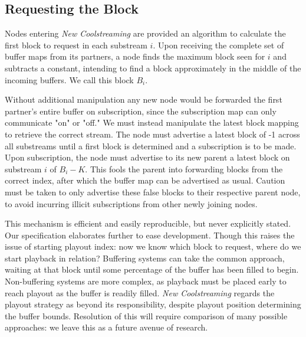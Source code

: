 \documentclass[12pt,a4paper]{article}
\begin{document}
\subsection{Requesting the Block} \label{problems:requesting}
Nodes entering \textit{New Coolstreaming} are provided an algorithm to calculate the first block to request in each substream \(i\). Upon receiving the complete set of buffer maps from its partners, a node finds the maximum block seen for \(i\) and subtracts a constant, intending to find a block approximately in the middle of the incoming buffers. We call this block \(B_i\).

Without additional manipulation any new node would be forwarded the first partner's entire buffer on subscription, since the subscription map can only communicate "on" or "off." We must instead manipulate the latest block mapping to retrieve the correct stream. The node must advertise a latest block of -1 across all substreams until a first block is determined and a subscription is to be made. Upon subscription, the node must advertise to its new parent a latest block on substream \(i\) of \(B_i - K\). This fools the parent into forwarding blocks from the correct index, after which the buffer map can be advertised as usual. Caution must be taken to only advertise these false blocks to their respective parent node, to avoid incurring illicit subscriptions from other newly joining nodes.

This mechanism is efficient and easily reproducible, but never explicitly stated. Our specification elaborates further to ease development. Though this raises the issue of starting playout index: now we know which block to request, where do we start playback in relation? Buffering systems can take the common approach, waiting at that block until some percentage of the buffer has been filled to begin. Non-buffering systems are more complex, as playback must be placed early to reach playout as the buffer is readily filled. \textit{New Coolstreaming} regards the playout strategy as beyond its responsibility, despite playout position determining the buffer bounds. Resolution of this will require comparison of many possible approaches: we leave this as a future avenue of research.
\end{document}
